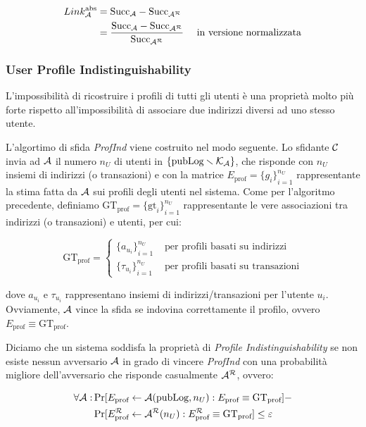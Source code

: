 \[ \begin{aligned} Link^{\text{abs}}_{\mathcal{A}} &= \text{Succ}_{\mathcal{A}} - \text{Succ}_{\mathcal{A}^\mathcal{R}} \\
   &= \frac{\text{Succ}_{\mathcal{A}} - \text{Succ}_{\mathcal{A}^\mathcal{R}}}{\text{Succ}_{\mathcal{A}^\mathcal{R}}} \quad \text{ in versione normalizzata}
   \end{aligned}\]

\subsubsection{User Profile Indistinguishability}\label{profile-indistinguishability}

L'impossibilità di ricostruire i profili di tutti gli utenti è una proprietà molto più forte rispetto all'impossibilità di associare due indirizzi diversi ad uno stesso utente.

L'algortimo di sfida \emph{ProfInd}\label{profind_alg} viene costruito nel modo seguente.
Lo sfidante $\mathcal{C}$ invia ad $\mathcal{A}$ il numero $n_U$ di utenti in $\{\text{pubLog} \smallsetminus \mathcal{K}_\mathcal{A}\}$, che risponde con $n_U$ insiemi di indirizzi (o transazioni) e con la matrice $E_\text{prof} = {\{g_i\}}^{n_U}_{i=1}$ rappresentante la stima fatta da $\mathcal{A}$ sui profili degli utenti nel sistema.
Come per l'algoritmo precedente, definiamo $\text{GT}_\text{prof} = {\{\text{gt}_i\}}^{n_U}_{i=1}$ rappresentante le vere associazioni tra indirizzi (o transazioni) e utenti, per cui:

\[
	\text{GT}_\text{prof} = \begin{cases}
		{\{a_{u_i}\}}^{n_U}_{i=1} &\text{ per profili basati su indirizzi} \\
		{\{\tau_{u_i}\}}^{n_U}_{i=1} &\text{ per profili basati su transazioni}
	\end{cases}
\]

dove $a_{u_i}$ e $\tau_{u_i}$ rappresentano insiemi di indirizzi/transazioni per l'utente $u_i$.
Ovviamente, $\mathcal{A}$ vince la sfida se indovina correttamente il profilo, ovvero $E_\text{prof} \equiv \text{GT}_\text{prof}$.



Diciamo che un sistema soddisfa la proprietà di \emph{Profile Indistinguishability} se non esiste nessun avversario $\mathcal{A}$ in grado di vincere \emph{ProfInd} con una probabilità migliore dell'avversario che risponde casualmente $\mathcal{A}^\mathcal{R}$, ovvero:

\[
	\begin{aligned}
		\forall \mathcal{A}: &\Pr [E_\text{prof} \leftarrow \mathcal{A}(\text{pubLog}, n_U): E_\text{prof} \equiv \text{GT}_\text{prof}] - \\
		&\Pr [ E^\mathcal{R}_\text{prof} \leftarrow \mathcal{A}^\mathcal{R}(n_U) : E^\mathcal{R}_\text{prof} \equiv \text{GT}_\text{prof} ] \leq \varepsilon
	\end{aligned}
\]

